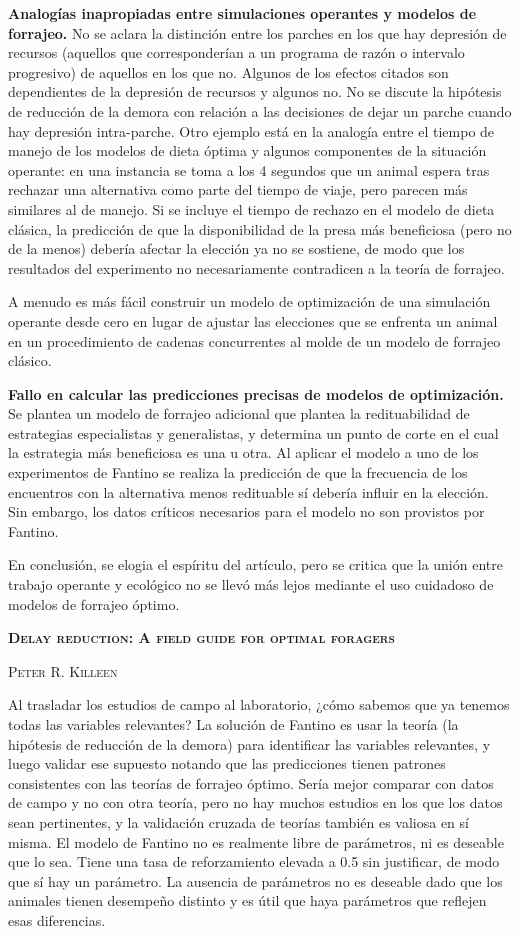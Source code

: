 \documentclass[a4paper,12pt]{article}
\begin{document}
{\bfseries Analogías inapropiadas entre simulaciones operantes y modelos de forrajeo.} No se aclara la distinción entre los parches en los que hay depresión de recursos (aquellos que corresponderían a un programa de razón o intervalo progresivo) de aquellos en los que no. Algunos de los efectos citados son dependientes de la depresión de recursos y algunos no. No se discute la hipótesis de reducción de la demora con relación a las decisiones de dejar un parche cuando hay depresión intra-parche. Otro ejemplo está en la analogía entre el tiempo de manejo de los modelos de dieta óptima y algunos componentes de la situación operante: en una instancia se toma a los 4 segundos que un animal espera tras rechazar una alternativa como parte del tiempo de viaje, pero parecen más similares al de manejo. Si se incluye el tiempo de rechazo en el modelo de dieta clásica, la predicción de que la disponibilidad de la presa más beneficiosa (pero no de la menos) debería afectar la elección ya no se sostiene, de modo que los resultados del experimento no necesariamente contradicen a la teoría de forrajeo.

A menudo es más fácil construir un modelo de optimización de una simulación operante desde cero en lugar de ajustar las elecciones que se enfrenta un animal en un procedimiento de cadenas concurrentes al molde de un modelo de forrajeo clásico.

{\bfseries Fallo en calcular las predicciones precisas de modelos de optimización.} Se plantea un modelo de forrajeo adicional que plantea la redituabilidad de estrategias especialistas y generalistas, y determina un punto de corte en el cual la estrategia más beneficiosa es una u otra. Al aplicar el modelo a uno de los experimentos de Fantino se realiza la predicción de que la frecuencia de los encuentros con la alternativa menos redituable sí debería influir en la elección. Sin embargo, los datos críticos necesarios para el modelo no son provistos por Fantino.

En conclusión, se elogia el espíritu del artículo, pero se critica que la unión entre trabajo operante y ecológico no se llevó más lejos mediante el uso cuidadoso de modelos de forrajeo óptimo.

{\scshape\bfseries Delay reduction: A field guide for optimal foragers}

{\scshape Peter R. Killeen}

Al trasladar los estudios de campo al laboratorio, ¿cómo sabemos que ya tenemos todas las variables relevantes? La solución de Fantino es usar la teoría (la hipótesis de reducción de la demora) para identificar las variables relevantes, y luego validar ese supuesto notando que las predicciones tienen patrones consistentes con las teorías de forrajeo óptimo. Sería mejor comparar con datos de campo y no con otra teoría, pero no hay muchos estudios en los que los datos sean pertinentes, y la validación cruzada de teorías también es valiosa en sí misma. 
El modelo de Fantino no es realmente libre de parámetros, ni es deseable que lo sea. Tiene una tasa de reforzamiento elevada a 0.5 sin justificar, de modo que sí hay un parámetro. La ausencia de parámetros no es deseable dado que los animales tienen desempeño distinto y es útil que haya parámetros que reflejen esas diferencias. 
\end{document}
